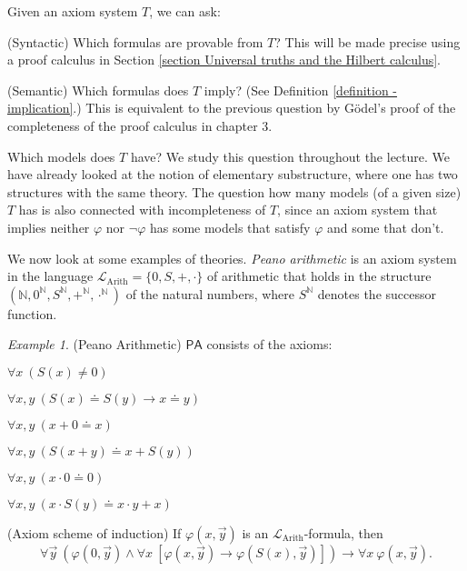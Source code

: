 \documentclass[a4paper, 11pt]{amsart}
\theoremstyle{remark}
\newtheorem{example}[example]{Example}
\newcommand{\axiomft}[1]{\mathsf{#1}}
\newcommand{\PA}{\axiomft{PA}}
\newcommand{\NN}{\mathbb{N}}
\newcommand{\cL}{\mathcal L}
\newenvironment{enumerate-(1)}{\begin{enumerate}[label={\upshape (\arabic*)}, leftmargin=2pc]}{\end{enumerate}}
\begin{document}
Given an axiom system $T$, we can ask: 
\begin{enumerate-(1)} 
\item 
(Syntactic) 
Which formulas are provable from $T$? 
This will be made precise using a proof calculus in Section \ref{section Universal truths and the Hilbert calculus}. 
\item 
(Semantic) 
Which formulas does $T$ imply? (See Definition \ref{definition - implication}.) 
This is equivalent to the previous question by G\"odel's proof of the completeness of the proof calculus in chapter 3. 

Which models does $T$ have? 
We study this question throughout the lecture. 
We have already looked at the notion of elementary substructure, where one has two structures with the same theory. 
The question how many models (of a given size) $T$ has is also connected with incompleteness of $T$, since an axiom system that implies neither $\varphi$ nor $\neg\varphi$ has some models that satisfy $\varphi$ and some that don't. 

\end{enumerate-(1)} 


We now look at some examples of theories. 
\emph{Peano arithmetic} is an axiom system in the language $\cL_{\mathrm{Arith}}=\{0, S, +, \cdot\}$ of arithmetic that holds in the structure $(\NN, 0^\NN,S^\NN,+^\NN,\cdot^\NN)$ of the natural numbers, where $S^\NN$ denotes the successor function. 


\begin{example}(Peano Arithmetic) 
\label{Peano arithmetic} 
$\PA$ consists of the axioms: 
\begin{enumerate-(1)} 
\item 
$\forall x\ (S(x)\neq 0)$ 
\item 
$\forall x, y \ (S(x)\doteq S(y) \rightarrow x\doteq y)$ 
\item 
$\forall x, y \ (x+0\doteq x)$ 
\item 
$\forall x, y \ (S(x+y)\doteq x+S(y))$ 
\item 
$\forall x, y \ (x\cdot 0\doteq 0)$ 
\item 
$\forall x, y \ (x\cdot S(y)\doteq x\cdot y + x)$ 
\item 
(Axiom scheme of induction) 
If $\varphi(x,\vec{y})$ is an $\cL_{\mathrm{Arith}}$-formula, then 
$$ \forall \vec{y}\  (\varphi(0,\vec{y}) \wedge \forall x\ [ \varphi(x,\vec{y}) \rightarrow \varphi(S(x),\vec{y}) ]   ) \rightarrow \forall x\ \varphi(x,\vec{y}) .$$ 
\end{enumerate-(1)} 
\end{example} 
\end{document}
